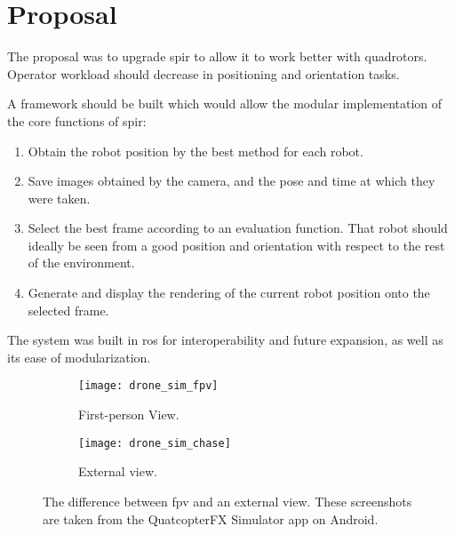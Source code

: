 \chapter{Proposal}
\label{sec:proposal}
  The proposal was to upgrade \gls{spir} to allow it to work better with quadrotors.
  Operator workload should decrease in positioning and orientation tasks.

  A framework should be built which would allow the modular implementation of the core functions of \gls{spir}:

  \begin{enumerate}
    \item Obtain the robot position by the best method for each robot.
    \item Save images obtained by the camera, and the pose and time at which they were taken.
    \item Select the best frame according to an evaluation function.
          That robot should ideally be seen from a good position and orientation with respect to the rest of the environment.
    \item Generate and display the rendering of the current robot position onto the selected frame.
  \end{enumerate}

  The system was built in \gls{ros} for interoperability and future expansion, as well as its ease of modularization.

  \begin{figure}[h]
    \centering
    \begin{subfigure}[b]{0.45\textwidth}
      \texttt{[image: drone\_sim\_fpv]}
      \caption{First-person View.}
    \end{subfigure}
    \hfill
    \begin{subfigure}[b]{0.45\textwidth}
      \texttt{[image: drone\_sim\_chase]}
      \caption{External view.}
    \end{subfigure}
    \caption[Difference between FPV and external views]{The difference between \gls{fpv} and an external view. These screenshots are taken from the QuatcopterFX Simulator app on Android.}
    \label{fig:fpv_vs_chase}
  \end{figure}

